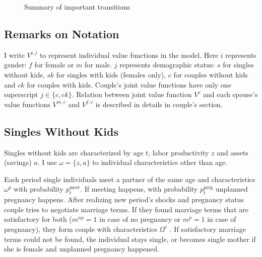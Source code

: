 \begin{figure}
\begin{center}
\caption{ Summary of important transitions \label{transitions} }
\end{center}
\end{figure}


\subsection{Remarks on Notation}
I write $V^{i,j}$ to represent individual value functions in the model. Here $i$ represents gender: $f$ for female or $m$ for male. $j$ represents demographic status: $s$ for singles without kids, $sk$ for singles with kids (females only), $c$ for couples without kids and $ck$ for couples with kids. Couple's joint value functions have only one superscript $j \in \{c,ck\}$. Relation between joint value function $V^{c}$ and each spouse's value functions $V^{m,c}$ and $V^{f,c}$ is described in details in couple's section.

\subsection{Singles Without Kids}
Singles without kids are characterized by age $t$, labor productivity $z$ and assets (savings) $a$. I use $\omega = \{z,a\}$ to individual characteristics other than age.

Each period single individuals meet a partner of the same age and characteristics $\omega^p$ with probability $p^{\text{meet}}_t$. If meeting happens, with probability $p^{\text{preg}}_t$ unplanned pregnancy happens. After realizing new period's shocks and pregnancy status couple tries to negotiate marriage terms. If they found marriage terms that are satisfactory for both ($m^{np} = 1$ in case of no pregnancy or $m^p = 1$ in case of pregnancy), they form couple with characteristics $\Omega^c$ . If satisfactory marriage terms could not be found, the individual stays single, or becomes single mother if she is female and unplanned pregnancy happened.


